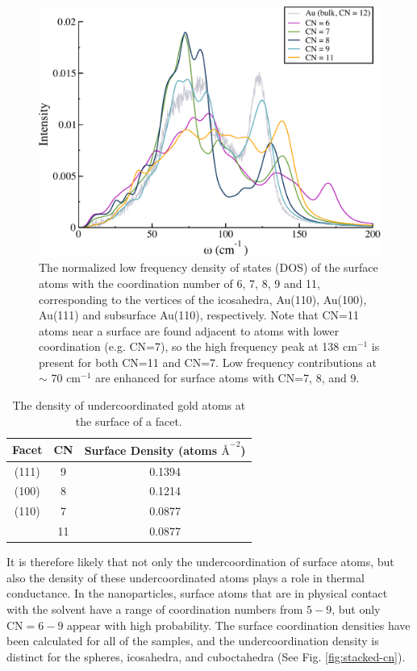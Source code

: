 \begin{figure}[!htb]
  \includegraphics[width=5in]{figures/surface-cn.pdf}
  \caption{The normalized low frequency density of states (DOS) of the
    surface atoms with the coordination number of 6, 7, 8, 9 and 11,
    corresponding to the vertices of the icosahedra, Au(110), Au(100),
    Au(111) and subsurface Au(110), respectively.  Note that CN=11
    atoms near a surface are found adjacent to atoms with lower
    coordination (e.g. CN=7), so the high frequency peak at 138
    cm$^{-1}$ is present for both CN=11 and CN=7.  Low frequency
    contributions at $\sim$ 70 cm$^{-1}$ are enhanced for surface
    atoms with CN=7, 8, and 9.}
  \label{fig:cn-spect}
\end{figure}

\begin{table}[h]
\centering
\caption{The density of undercoordinated gold atoms at the surface of a facet.  
\label{tab:au-den}}
\renewcommand*{\arraystretch}{2}
\begin{tabular}{ ccc }
\toprule
Facet & CN & Surface Density (atoms $\text{\AA}^{-2}$)\\
\midrule
        (111) & 9  & 0.1394 \\
\midrule
        (100) & 8  & 0.1214 \\
\midrule
        (110) & 7  & 0.0877 \\
              & 11 & 0.0877 \\
\bottomrule
\end{tabular}
\end{table}

It is therefore likely that not only the undercoordination of surface
atoms, but also the density of these undercoordinated atoms plays a
role in thermal conductance. In the nanoparticles, surface atoms that
are in physical contact with the solvent have a range of coordination
numbers from $5 - 9$, but only $\text{CN} = 6 - 9$ appear with high
probability.  The surface coordination densities have been calculated
for all of the samples, and the undercoordination density is distinct
for the spheres, icosahedra, and cuboctahedra (See
Fig. \ref{fig:stacked-cn}).

